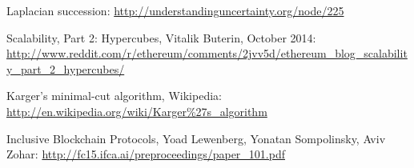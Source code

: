 \documentclass[11pt,a4paper]{report}
\theoremstyle{plain}
\theoremstyle{definition}
\theoremstyle{remark}
\begin{document}
\begin{thebibliography}{27}
    Laplacian succession: \url{http://understandinguncertainty.org/node/225}

    Scalability, Part 2: Hypercubes, Vitalik Buterin, October 2014: \url{http://www.reddit.com/r/ethereum/comments/2jvv5d/ethereum_blog_scalability_part_2_hypercubes/}

    Karger's minimal-cut algorithm, Wikipedia: \url{http://en.wikipedia.org/wiki/Karger%27s_algorithm}

    Inclusive Blockchain Protocols, Yoad Lewenberg, Yonatan Sompolinsky, Aviv Zohar: \url{http://fc15.ifca.ai/preproceedings/paper_101.pdf}

\end{thebibliography}
\end{document}
